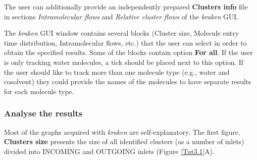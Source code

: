 \documentclass[9pt,tutorial]{livecoms}
\begin{document}
The user can additionally provide an independently prepared \textbf{Clusters info} file in sections \textit{Intramolecular flows} and \textit{Relative cluster flows} of the \textit{kraken} GUI. 

The \textit{kraken} GUI window contains several blocks (Cluster size, Molecule entry time distribution, Intramolecular flows, etc.) that the user can select in order to obtain the specified results. Some of the blocks contain option \textbf{For all}. If the user is only tracking water molecules, a tick should be placed next to this option. If the user should like to track more than one molecule type (e.g., water and cosolvent) they could provide the names of the molecules to have separate results for each molecule type. 

\subsubsection{Analyse the results}
Most of the graphs acquired with \textit{kraken} are self-explanatory. 
The first figure, \textbf{Clusters size} presents the size of all identified clusters (as a number of inlets) divided into INCOMING and OUTGOING inlets (Figure \ref{Tut3.1}A).
\end{document}
